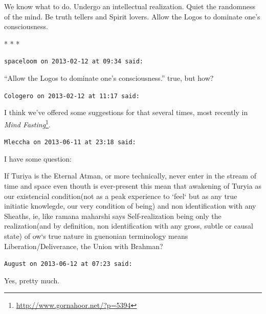 We know what to do. Undergo an intellectual realization. Quiet the randomness of the mind. Be truth tellers and Spirit lovers. Allow the Logos to dominate one's consciousness.



\begin{center}* * *\end{center}

\begin{footnotesize}
\begin{sffamily}
\texttt{spaceloom on 2013-02-12 at 09:34 said:}

``Allow the Logos to dominate one's consciousness.'' true, but how?

\hfill

\texttt{Cologero on 2013-02-12 at 11:17 said:}

I think we've offered some suggestions for that several times, most recently in \textit{Mind Fasting}\footnote{\url{http://www.gornahoor.net/?p=5394}}.

\hfill

\texttt{Mleccha on 2013-06-11 at 23:18 said:}

I have some question:

If Turiya is the Eternal Atman, or more technically, never enter in the stream of time and space even thouth is ever-present this mean that awakening of Turyia as our existencial condition(not as a peak experience to `feel` but as any true initiatic knowlegde, our very condition of being) and non identification with any Sheaths, ie, like ramana maharshi says Self-realization being only the realization(and by definition, non identification with any gross, subtle or causal state) of ow`s true nature in guenonian terminology means Liberation/Deliverance, the Union with Brahman?

\hfill

\texttt{August on 2013-06-12 at 07:23 said:}

Yes, pretty much.


\hfill

\end{sffamily}
\end{footnotesize}


